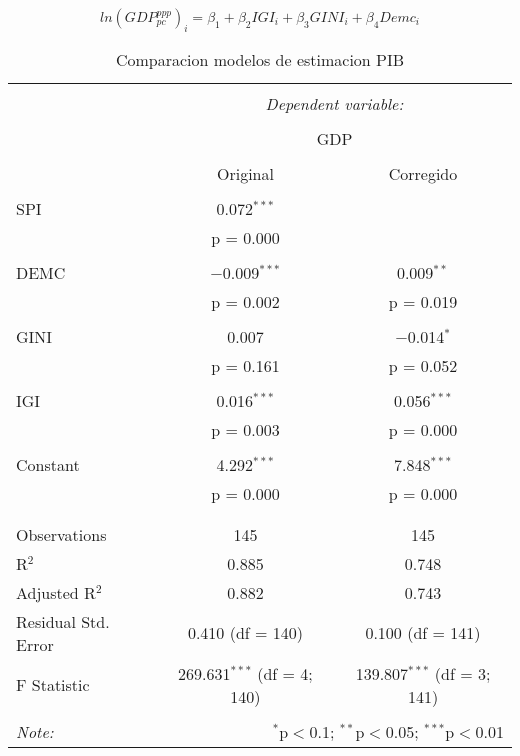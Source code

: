 \documentclass[11pt]{article}
\begin{document}
{$$ln(GDP_{pc}^{ppp})_i = \beta_1 + \beta_2 IGI_i + \beta_3 GINI_i + \beta_4 Demc_i $$

\begin{table}[H] \centering 
  \caption{Comparacion modelos de estimacion PIB} 
  \label{} 
\begin{tabular}{@{\extracolsep{5pt}}lcc} 
\\[-1.8ex]\hline 
\hline \\[-1.8ex] 
 & \multicolumn{2}{c}{\textit{Dependent variable:}} \\ 
\cline{2-3} 
\\[-1.8ex] & \multicolumn{2}{c}{GDP} \\ 
\\[-1.8ex] & Original & Corregido\\ 
\hline \\[-1.8ex] 
 SPI & 0.072$^{***}$ &  \\ 
  & p = 0.000 &  \\ 
  & & \\ 
 DEMC & $-$0.009$^{***}$ & 0.009$^{**}$ \\ 
  & p = 0.002 & p = 0.019 \\ 
  & & \\ 
 GINI & 0.007 & $-$0.014$^{*}$ \\ 
  & p = 0.161 & p = 0.052 \\ 
  & & \\ 
 IGI & 0.016$^{***}$ & 0.056$^{***}$ \\ 
  & p = 0.003 & p = 0.000 \\ 
  & & \\ 
 Constant & 4.292$^{***}$ & 7.848$^{***}$ \\ 
  & p = 0.000 & p = 0.000 \\ 
  & & \\ 
\hline \\[-1.8ex] 
Observations & 145 & 145 \\ 
R$^{2}$ & 0.885 & 0.748 \\ 
Adjusted R$^{2}$ & 0.882 & 0.743 \\ 
Residual Std. Error & 0.410 (df = 140) & 0.100 (df = 141) \\ 
F Statistic & 269.631$^{***}$ (df = 4; 140) & 139.807$^{***}$ (df = 3; 141) \\ 
\hline 
\hline \\[-1.8ex] 
\textit{Note:}  & \multicolumn{2}{r}{$^{*}$p$<$0.1; $^{**}$p$<$0.05; $^{***}$p$<$0.01} \\ 
\end{tabular} 
\end{table} 

}
\end{document}
